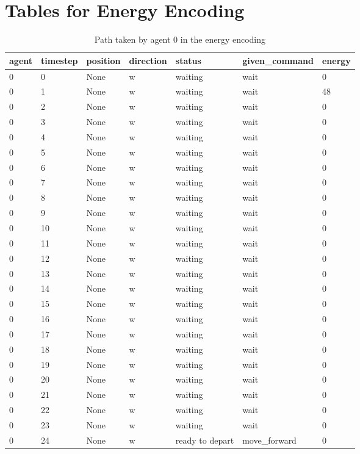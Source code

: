 \section{Tables for Energy Encoding}
\begin{table}[H]
  \centering
  \caption{Path taken by agent 0 in the energy encoding}
  \label{tab:energy0}
  \begin{tabular}{lllllll}
    \toprule
    agent & timestep & position & direction & status & given\_command & energy \\
    \midrule
0 & 0 & None & w & waiting & wait & 0 \\
0 & 1 & None & w & waiting & wait & 48 \\
0 & 2 & None & w & waiting & wait & 0 \\
0 & 3 & None & w & waiting & wait & 0 \\
0 & 4 & None & w & waiting & wait & 0 \\
0 & 5 & None & w & waiting & wait & 0 \\
0 & 6 & None & w & waiting & wait & 0 \\
0 & 7 & None & w & waiting & wait & 0 \\
0 & 8 & None & w & waiting & wait & 0 \\
0 & 9 & None & w & waiting & wait & 0 \\
0 & 10 & None & w & waiting & wait & 0 \\
0 & 11 & None & w & waiting & wait & 0 \\
0 & 12 & None & w & waiting & wait & 0 \\
0 & 13 & None & w & waiting & wait & 0 \\
0 & 14 & None & w & waiting & wait & 0 \\
0 & 15 & None & w & waiting & wait & 0 \\
0 & 16 & None & w & waiting & wait & 0 \\
0 & 17 & None & w & waiting & wait & 0 \\
0 & 18 & None & w & waiting & wait & 0 \\
0 & 19 & None & w & waiting & wait & 0 \\
0 & 20 & None & w & waiting & wait & 0 \\
0 & 21 & None & w & waiting & wait & 0 \\
0 & 22 & None & w & waiting & wait & 0 \\
0 & 23 & None & w & waiting & wait & 0 \\
0 & 24 & None & w & ready to depart & move\_forward & 0 \\

\end{tabular}
\end{table}
